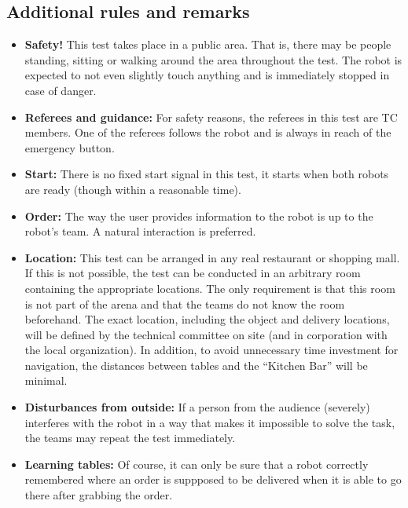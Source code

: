 \subsection{Additional rules and remarks}

\begin{itemize}
	\item \textbf{Safety!} This test takes place in a public area. That is, there may be people standing, sitting or walking around the area throughout the test. The robot is expected to not even slightly touch anything and is immediately stopped in case of danger.

	\item \textbf{Referees and guidance:} For safety reasons, the referees in this test are TC members. One of the referees follows the robot and is always in reach of the emergency button.

	\item \textbf{Start:} There is no fixed start signal in this test, it starts when both robots are ready (though within a reasonable time).

	\item \textbf{Order:} The way the user provides information to the robot is up to the robot's team. A natural interaction is preferred.

	\item \textbf{Location:} This test can be arranged in any real restaurant or shopping mall. If this is not possible, the test can be conducted in an arbitrary room containing the appropriate locations.
	  The only requirement is that this room is not part of the arena and that the teams do not know the room beforehand.
	  The exact location, including the object and delivery locations, will be defined by the technical committee on site (and in corporation with the local organization).
	  In addition, to avoid unnecessary time investment for navigation, the distances between tables and the \enquote{Kitchen Bar} will be minimal.

	\item \textbf{Disturbances from outside:} If a person from the audience (severely) interferes with the robot in a way that makes it impossible to solve the task, the teams may repeat the test immediately.

	\item \textbf{Learning tables:} Of course, it can only be sure that a robot correctly remembered where an order is suppposed to be delivered when it is able to go there after grabbing the order.


\end{itemize}
